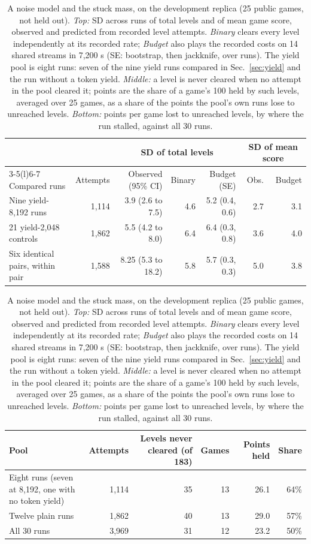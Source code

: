\begin{table}[!htb]
\centering\footnotesize\setlength{\tabcolsep}{4pt}
\caption{A noise model and the stuck mass, on the development replica (25 public games, not held out).
\emph{Top:} SD across runs of total levels and of mean game score, observed and predicted from recorded level attempts.
\emph{Binary} clears every level independently at its recorded rate; \emph{Budget} also plays the recorded costs on 14 shared streams in 7,200 s (SE: bootstrap, then jackknife, over runs).
The yield pool is eight runs: seven of the nine yield runs compared in Sec.~\ref{sec:yield} and the run without a token yield.
\emph{Middle:} a level is never cleared when no attempt in the pool cleared it; points are the share of a game's 100 held by such levels, averaged over 25 games, as a share of the points the pool's own runs lose to unreached levels.
\emph{Bottom:} points per game lost to unreached levels, by where the run stalled, against all 30 runs.}
\label{tab:noisemodel}
\begin{tabular}{@{}p{3.1cm}rrrrrr@{}}
\toprule
 & & \multicolumn{3}{c}{SD of total levels} & \multicolumn{2}{c}{SD of mean score} \\
\cmidrule(lr){3-5}\cmidrule(l){6-7}
Compared runs & Attempts & Observed (95\% CI) & Binary & Budget (SE) & Obs. & Budget \\
\midrule
Nine yield-8,192 runs & 1,114 & 3.9 (2.6 to 7.5) & 4.6 & 5.2 (0.4, 0.6) & 2.7 & 3.1 \\ %
21 yield-2,048 controls & 1,862 & 5.5 (4.2 to 8.0) & 6.4 & 6.4 (0.3, 0.8) & 3.6 & 4.0 \\ %
Six identical pairs, within pair & 1,588 & 8.25 (5.3 to 18.2) & 5.8 & 5.7 (0.3, 0.3) & 5.0 & 3.8 \\ %
\bottomrule
\end{tabular}

\medskip
\begin{tabular}{@{}p{3.1cm}rrrrr@{}}
\toprule
Pool & Attempts & Levels never cleared (of 183) & Games & Points held & Share \\
\midrule
Eight runs (seven at 8,192, one with no token yield) & 1,114 & 35 & 13 & 26.1 & 64\% \\ %
Twelve plain runs & 1,862 & 40 & 13 & 29.0 & 57\% \\ %
All 30 runs & 3,969 & 31 & 12 & 23.2 & 50\% \\ %
\bottomrule
\end{tabular}


\end{table}
